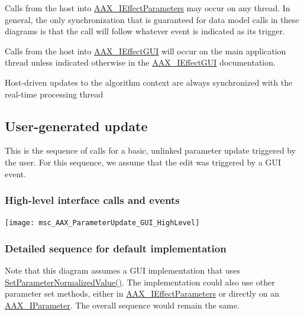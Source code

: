 \begin{DoxyItemize}
\item Calls from the host into \mbox{\hyperlink{a01825}{A\+A\+X\+\_\+\+I\+Effect\+Parameters}} may occur on any thread. In general, the only synchronization that is guaranteed for data model calls in these diagrams is that the call will follow whatever event is indicated as its trigger.
\item Calls from the host into \mbox{\hyperlink{a01821}{A\+A\+X\+\_\+\+I\+Effect\+G\+UI}} will occur on the main application thread unless indicated otherwise in the \mbox{\hyperlink{a01821}{A\+A\+X\+\_\+\+I\+Effect\+G\+UI}} documentation.
\item Host-\/driven updates to the algorithm context are always synchronized with the real-\/time processing thread
\end{DoxyItemize}\hypertarget{a00823_parameterUpdates_sequences_user}{}\subsection{User-\/generated update}\label{a00823_parameterUpdates_sequences_user}
This is the sequence of calls for a basic, unlinked parameter update triggered by the user. For this sequence, we assume that the edit was triggered by a G\+UI event.\hypertarget{a00823_parameterUpdates_sequences_updateSequences_user_highlevel}{}\subsubsection{High-\/level interface calls and events}\label{a00823_parameterUpdates_sequences_updateSequences_user_highlevel}

\begin{DoxyImage}
\texttt{[image: msc\_AAX\_ParameterUpdate\_GUI\_HighLevel]}
\end{DoxyImage}
 \hypertarget{a00823_parameterUpdates_sequences_user_details}{}\subsubsection{Detailed sequence for default implementation}\label{a00823_parameterUpdates_sequences_user_details}
Note that this diagram assumes a G\+UI implementation that uses \mbox{\hyperlink{a01669_a368b0f5a761d1eda4c41b420f153a077}{Set\+Parameter\+Normalized\+Value()}}. The implementation could also use other parameter set methods, either in \mbox{\hyperlink{a01825}{A\+A\+X\+\_\+\+I\+Effect\+Parameters}} or directly on an \mbox{\hyperlink{a01857}{A\+A\+X\+\_\+\+I\+Parameter}}. The overall sequence would remain the same.


